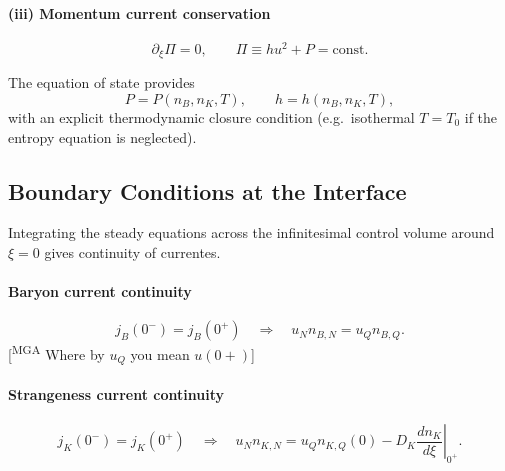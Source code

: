 \documentclass[11pt]{article}
\newcommand{\mgacom}[1]{\textsf{\color[rgb]{0.6,0,0}[\textsuperscript{MGA} #1]}}
\begin{document}
\paragraph{(iii) Momentum current conservation}
\begin{equation}
\partial_\xi \Pi = 0,
\qquad
\Pi \equiv h u^2 + P = \text{const}.
\end{equation}

The equation of state provides
\begin{equation}
P = P(n_B, n_K, T), 
\qquad
h = h(n_B, n_K, T),
\end{equation}
with an explicit thermodynamic closure condition 
(e.g.\ isothermal $T = T_0$ if the entropy equation is neglected).

\subsection*{Boundary Conditions at the Interface}

Integrating the steady equations across the infinitesimal control volume 
around $\xi = 0$ gives continuity of currentes.

\paragraph{Baryon current continuity}
\begin{equation}
j_B(0^-) = j_B(0^+)
\quad \Rightarrow \quad
u_N n_{B,N} = u_Q n_{B,Q}.
\end{equation}
\mgacom{Where by $u_Q$ you mean $u(0+)$}

\paragraph{Strangeness current continuity}
\begin{equation}
j_K(0^-) = j_K(0^+)
\quad \Rightarrow \quad
u_N n_{K,N}
=
u_Q n_{K,Q}(0)
-
D_K \left. \frac{d n_K}{d \xi} \right|_{0^+}.
\end{equation}
\end{document}
